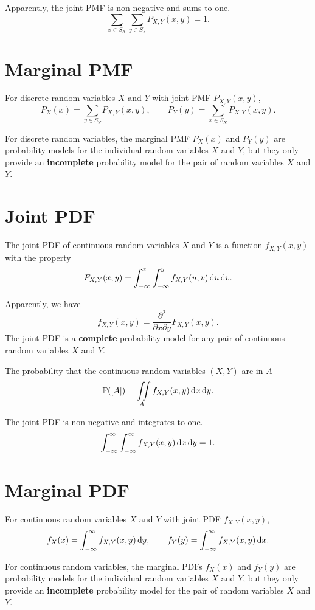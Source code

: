 Apparently, the joint PMF is non-negative and sums to one.
\[\sum_{x\in S_X}\sum_{y\in S_Y}P_{X,Y}(x,y)=1.\]

\section{Marginal PMF}
\begin{theorem}
    For discrete random variables $X$ and $Y$ with joint PMF $P_{X,Y}(x,y)$, 
    \[P_X(x)=\sum_{y\in S_Y}P_{X,Y}(x,y), \qquad P_Y(y)=\sum_{x\in S_X}P_{X,Y}(x,y).\]
\end{theorem}
For discrete random variables, the marginal PMF $P_X(x)$ and $P_Y(y)$ are probability models for the individual random variables $X$ and $Y$, but they only provide an \textbf{incomplete} probability model for the pair of random variables $X$ and $Y$.

\section{Joint PDF}
\begin{definition}
    The joint PDF of continuous random variables $X$ and $Y$ is a function $f_{X,Y}(x,y)$ with the property
    \[F_{X,Y}(x,y)=\int_{-\infty}^{x}\int_{-\infty}^{y}f_{X,Y}(u,v)\mathop{}\!\mathrm{d} u \mathop{}\!\mathrm{d} v.\]
\end{definition}

Apparently, we have
\[f_{X,Y}(x,y)=\frac{\partial^2}{\partial x\partial y}F_{X,Y}(x,y).\]
The joint PDF is a \textbf{complete} probability model for any pair of continuous random variables $X$ and $Y$.

\begin{theorem}
    The probability that the continuous random variables $(X,Y)$ are in $A$ 
    \[\P{[A]}=\iint\limits_A f_{X,Y}(x,y)\diff x\diff y.\]
\end{theorem}

The joint PDF is non-negative and integrates to one.
\[\int_{-\infty}^{\infty}\int_{-\infty}^{\infty}f_{X,Y}(x,y)\mathop{}\!\mathrm{d} x\mathop{}\!\mathrm{d} y=1.\]

\section{Marginal PDF}
\begin{theorem}
    For continuous random variables $X$ and $Y$ with joint PDF $f_{X,Y}(x,y)$, 
    \[f_X(x)=\int_{-\infty}^{\infty}f_{X,Y}(x,y)\mathop{}\!\mathrm{d} y, \qquad f_Y(y)=\int_{-\infty}^{\infty}f_{X,Y}(x,y)\mathop{}\!\mathrm{d} x.\]
\end{theorem}
For continuous random variables, the marginal PDFs $f_X(x)$ and $f_Y(y)$ are probability models for the individual random variables $X$ and $Y$, but they only provide an \textbf{incomplete} probability model for the pair of random variables $X$ and $Y$.

